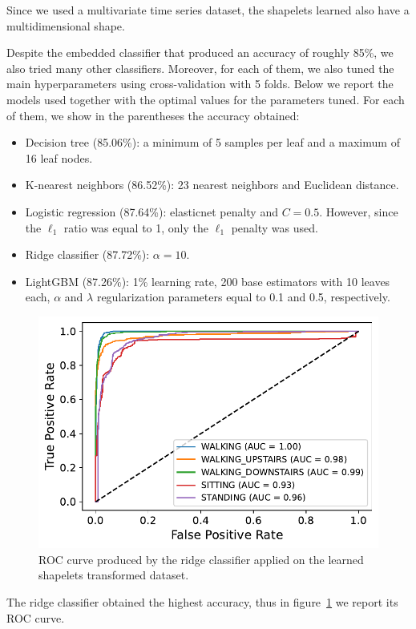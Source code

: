 \documentclass[10pt, a4paper, twocolumn]{article}
\begin{document}
Since we used a multivariate time series dataset, the shapelets learned also have a multidimensional shape.%

Despite the embedded classifier that produced an accuracy of roughly 85\%, we also tried many other classifiers. Moreover, for each of them, we also tuned the main hyperparameters using cross-validation with 5 folds. Below we report the models used together with the optimal values for the parameters tuned. For each of them, we show in the parentheses the accuracy obtained:

\begin{itemize}
	\item Decision tree (85.06\%): a minimum of 5 samples per leaf and a maximum of 16 leaf nodes.
	\item K-nearest neighbors (86.52\%): 23 nearest neighbors and Euclidean distance.
	\item Logistic regression (87.64\%): elasticnet penalty and $C=0.5$. However, since the $\ell_1$ ratio was equal to 1, only the $\ell_1$ penalty was used.
	\item Ridge classifier (87.72\%): $\alpha=10$. 
	\item LightGBM (87.26\%): 1\% learning rate, 200 base estimators with 10 leaves each, $\alpha$ and $\lambda$ regularization parameters equal to 0.1 and 0.5, respectively. 
\end{itemize}

\begin{figure}
    \centering
    \includegraphics[width=0.6\linewidth]{immagini simone/ridge_shapelets.pdf}
    \caption{ROC curve produced by the ridge classifier applied on the learned shapelets transformed dataset.}
    \label{fig:roc_ridge_shapelets}
\end{figure}

The ridge classifier obtained the highest accuracy, thus in figure~\ref{fig:roc_ridge_shapelets} we report its ROC curve.
\end{document}

